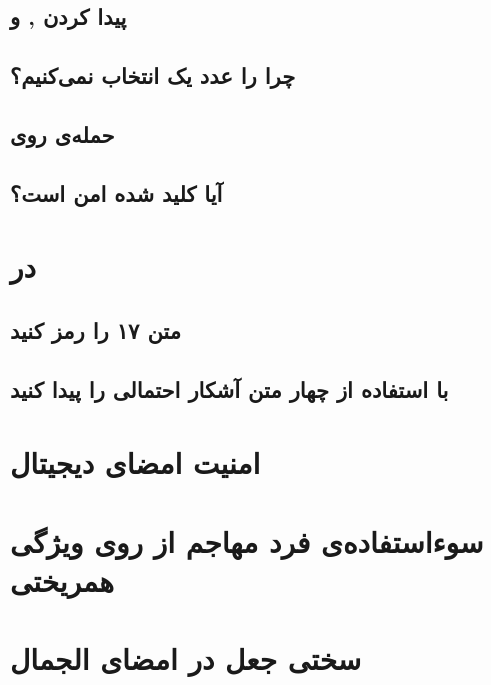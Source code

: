 \documentclass{article}
\begin{document}
\subsection{پیدا کردن ,  و }
\subsection{چرا  را عدد یک انتخاب نمی‌کنیم؟}
\subsection{حمله‌ی  روی }
\subsection{آیا کلید  شده امن است؟}

\section{در }
\subsection{متن ۱۷ را رمز کنید}
\subsection{با استفاده از  چهار متن آشکار احتمالی را پیدا کنید}

\section{امنیت امضای دیجیتال }

\section{سوء‌استفاده‌ی فرد مهاجم از روی ویژگی همریختی }

\section{سختی جعل در امضای الجمال}
\end{document}
